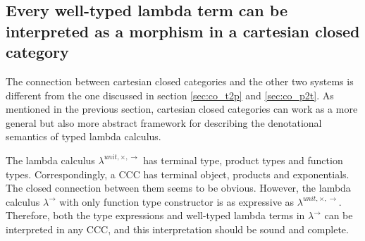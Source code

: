 \clearpage
\subsection{Every well-typed lambda term can be interpreted as a morphism in a cartesian closed category}
\label{sec:co_t2m}
The connection between cartesian closed categories and the other two systems is different from the one discussed in section \ref{sec:co_t2p} and \ref{sec:co_p2t}. As mentioned in the previous section, cartesian closed categories can work as a more general but also more abstract framework for describing the denotational semantics of typed lambda calculus.

The lambda calculus $ \lambda ^{unit, \times , \to } $ has terminal type, product types and function types. Correspondingly, a CCC has terminal object, products and exponentials. The closed connection between them seems to be obvious. However, the lambda calculus $ \lambda ^ \to $ with only function type constructor is as expressive as $ \lambda ^{unit, \times , \to } $. Therefore, both the type expressions and well-typed lambda terms in $ \lambda ^ \to $ can be interpreted in any CCC, and this interpretation should be sound and complete.

